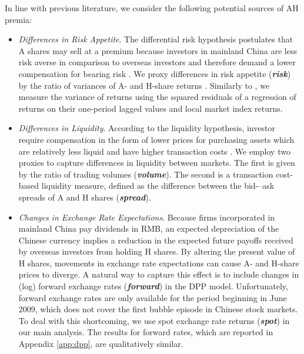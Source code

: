 \documentclass[11pt]{article}
\begin{document}
In line with previous literature, we consider the following potential sources of AH premia:
\begin{itemize}
\item \textit{Differences in Risk Appetite}. The differential risk hypothesis postulates that A shares may sell at a premium because investors in mainland China are less risk averse in comparison to overseas investors and therefore demand a lower compensation for bearing risk \citep{Ma1996}. We proxy differences in risk appetite (\textbf{\textit{risk}}) by the ratio of variances of A- and H-share returns \citep{wangJ2004,chungHL2013}. Similarly to \citet{wangJ2004}, we measure the variance of returns using the squared residuals of a regression of returns on their one-period lagged values and local market index returns.

\item \textit{Differences in Liquidity}. According to the liquidity hypothesis, investor require compensation in the form of lower prices for purchasing assets which are relatively less liquid and have higher transaction costs \citep{amihudM1986}. We employ two proxies to capture differences in liquidity between markets. The first is given by the ratio of trading volumes (\textit{\textbf{volume}}). The second is a transaction cost-based liquidity measure, defined as the difference between the bid-–ask spreads of A and H shares (\textit{\textbf{spread}}).

\item \textit{Changes in Exchange Rate Expectations}. Because firms incorporated in mainland China pay dividends in RMB, an expected depreciation of the Chinese currency implies a reduction in the expected future payoffs received by overseas investors from holding H shares. By altering the present value of H shares, movements in exchange rate expectations can  cause A- and H-share prices to diverge. A natural way to capture this effect is to include changes in (log) forward exchange rates (\textit{\textbf{forward}}) in the DPP model. Unfortunately, forward exchange rates are only available for the period beginning in June 2009, which does  not cover the first bubble episode in Chinese stock markets. To deal with this shortcoming, we use spot exchange rate returns (\textit{\textbf{spot}}) in our main analysis. The results for forward rates, which are reported in Appendix \ref{app:dpp}, are qualitatively similar.


\end{itemize}
\end{document}
